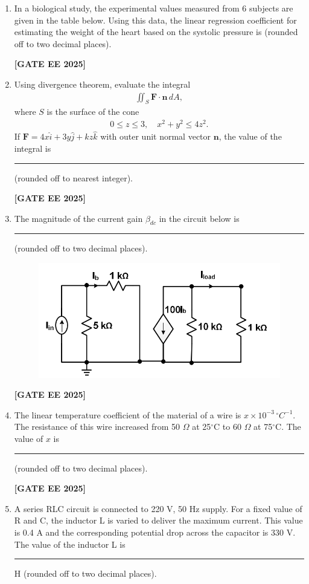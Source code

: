 \documentclass[journal]{IEEEtran}
\newcommand{\qfooter}{%
  \begin{flushright}\footnotesize\textbf{[GATE EE 2025]}\end{flushright}\vspace{1em}%
}
\begin{document}
\begin{enumerate}
\item In a biological study, the experimental values measured from 6 subjects are given in the table below. Using this data, the linear regression coefficient for estimating the weight of the heart based on the systolic pressure is \underline{\hspace{2cm}} (rounded off to two decimal places).


\qfooter

\item Using divergence theorem, evaluate the integral
\begin{align}
\iint_S \mathbf{F} \cdot \mathbf{n} \, dA,
\end{align}
where \( S \) is the surface of the cone
\begin{align}
0 \le z \le 3, \quad x^2 + y^2 \le 4z^2.
\end{align}
If \(\mathbf{F} = 4x \hat{i} + 3y \hat{j} + k z \hat{k}\) with outer unit normal vector \(\mathbf{n}\), the value of the integral is \rule{2cm}{0.15mm} (rounded off to nearest integer).

\qfooter

\item The magnitude of the current gain \(\beta_{dc}\) in the circuit below is \rule{2cm}{0.15mm} (rounded off to two decimal places).

\begin{figure}[H]
    \centering
    \includegraphics[width=0.6\columnwidth]{figs/q52.png}
\end{figure}

\qfooter

\item The linear temperature coefficient of the material of a wire is \(x \times 10^{-3} \,^\circ C^{-1}\).
The resistance of this wire increased from 50 \(\Omega\) at 25\(^\circ\)C to 60 \(\Omega\) at 75\(^\circ\)C.
The value of \(x\) is \rule{2cm}{0.15mm} (rounded off to two decimal places).

\qfooter

\item A series RLC circuit is connected to 220 V, 50 Hz supply. For a fixed value of R and C, the inductor L is varied to deliver the maximum current.
This value is 0.4 A and the corresponding potential drop across the capacitor is 330 V.
The value of the inductor L is \rule{2cm}{0.15mm} H (rounded off to two decimal places).


\end{enumerate}
\end{document}

